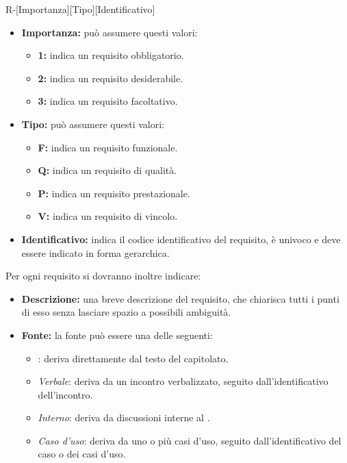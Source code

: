 \begin{center}
R-[Importanza][Tipo][Identificativo]
\end{center}
\begin{itemize}
	\item \textbf{Importanza:} può assumere questi valori:
  		\begin{itemize}
    		\item \textbf{1:} indica un requisito obbligatorio.
    		\item \textbf{2:} indica un requisito desiderabile.
    		\item \textbf{3:} indica un requisito facoltativo.
  		\end{itemize}
  	\item \textbf{Tipo:} può assumere questi valori:
  		\begin{itemize}
   		 	\item \textbf{F:} indica un requisito funzionale.
    		\item \textbf{Q:} indica un requisito di qualità.
    		\item \textbf{P:} indica un requisito prestazionale.
    		\item \textbf{V:} indica un requisito di vincolo.
  		\end{itemize}
  	\item \textbf{Identificativo:} indica il codice identificativo del requisito, è univoco e deve essere indicato in forma gerarchica.
\end{itemize}
Per ogni requisito si dovranno inoltre indicare:
\begin{itemize}
  \item \textbf{Descrizione:} una breve descrizione del requisito, che chiarisca tutti i punti di esso senza lasciare spazio a possibili ambiguità.
  \item \textbf{Fonte:} la fonte può essere una delle seguenti:
  \begin{itemize}
    \item \textit{}: deriva direttamente dal testo del capitolato.
    \item \textit{Verbale}: deriva da un incontro verbalizzato, seguito dall'identificativo dell'incontro.
    \item \textit{Interno}: deriva da discussioni interne al .
    \item \textit{Caso d'uso}: deriva da uno o più casi d'uso, seguito dall'identificativo del caso o dei casi d'uso.
  \end{itemize}
\end{itemize}

